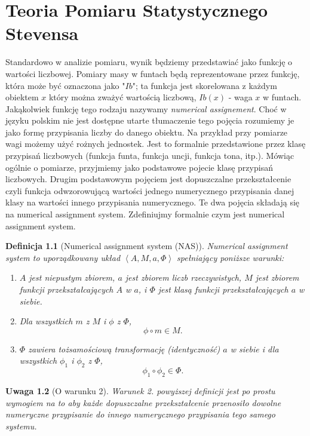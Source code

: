 \documentclass[12pt,a4paper]{report}
\newtheorem{definition}{Definicja}[chapter]
\newtheorem{remark}[definition]{Uwaga}
\newcommand{\tuple}[1]{\left\langle {#1} \right\rangle}
\begin{document}
\chapter{Teoria Pomiaru Statystycznego Stevensa}

Standardowo w analizie pomiaru, wynik będziemy przedstawiać jako funkcję o wartości liczbowej. Pomiary masy w funtach będą reprezentowane przez funkcję, która może być oznaczona jako "$Ib$";  ta funkcja jest skorelowana z każdym obiektem $x$ który można zważyć wartością liczbową, $Ib(x)$ - waga $x$ w funtach. Jakąkolwiek funkcję tego rodzaju nazywamy \textit{numerical assignement}. Choć w języku polskim nie jest dostępne utarte tłumaczenie tego pojęcia rozumiemy je jako formę przypisania liczby do danego obiektu. Na przykład przy pomiarze wagi możemy użyć rożnych jednostek. Jest to formalnie przedstawione  przez klasę przypisań liczbowych (funkcja funta, funkcja uncji, funkcja tona, itp.). Mówiąc ogólnie o pomiarze, przyjmiemy jako podstawowe pojecie klasę przypisań liczbowych. Drugim podstawowym pojęciem jest dopuszczalne przekształcenie czyli funkcja odwzorowującą wartości jednego numerycznego przypisania danej klasy na wartości innego przypisania numerycznego. Te dwa pojęcia składają się na numerical assignment system. Zdefiniujmy formalnie czym jest numerical assignment system.
\begin{definition}[Numerical assignment system (NAS)]
Numerical assignment system to uporządkowany układ $\tuple{A, M, a, \Phi}$ spełniający poniższe warunki:
\begin{enumerate}
\item
$A$ jest niepustym zbiorem, $a$ jest zbiorem liczb rzeczywistych, $M$ jest zbiorem funkcji przekształcających $A$ w $a$, i $\Phi$ jest klasą funkcji przekształcających $a$ w siebie.  
\item
Dla wszystkich $m$ z $M$ i $\phi$ z $\Phi$, 
$$
\phi \circ m \in M.
$$ 
\item
$\Phi$ zawiera tożsamościową transformację (identyczność) $a$ w siebie i dla wszystkich $\phi_{1}$ i $\phi_{2}$ z $\Phi$, 
$$
\phi_{1} \circ \phi_{2} \in \Phi.
$$

\end{enumerate}

\end{definition}

\begin{remark}[O warunku 2]
Warunek 2. powyższej definicji jest po prostu wymogiem na to aby każde dopuszczalne przekształcenie  przenosiło dowolne numeryczne przypisanie do innego numerycznego przypisania tego samego systemu.
\end{remark}
\end{document}
